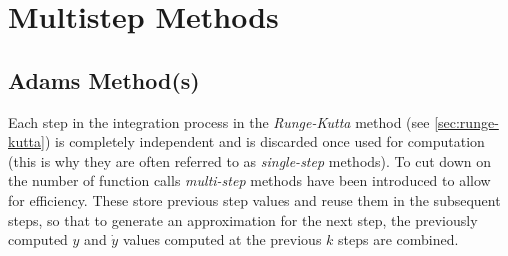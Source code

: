 \section{Multistep Methods}\label{sec:multistep-methods}


\subsection{Adams Method(s)}\label{ssec:adams-method}

Each step in the integration process in the \emph{Runge-Kutta} method (see 
\autoref{sec:runge-kutta}) is completely independent and is discarded once 
used for computation (this is why they are often referred to as \emph{single-step} 
methods). To cut down on the number of function calls \emph{multi-step} methods 
have been introduced to allow for efficiency. These store previous step values 
and reuse them in the subsequent steps, so that to generate an approximation 
for the next step, the previously computed $y$ and $\dot{y}$ values computed 
at the previous $k$ steps are combined.

